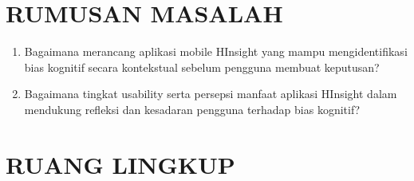 \documentclass[11pt]{article}
\begin{document}
\section{RUMUSAN MASALAH}
 
\begin{enumerate}
  \item Bagaimana merancang aplikasi mobile HInsight yang mampu mengidentifikasi bias kognitif secara kontekstual sebelum pengguna membuat keputusan?
  \item Bagaimana tingkat usability serta persepsi manfaat aplikasi HInsight dalam mendukung refleksi dan kesadaran pengguna terhadap bias kognitif?
\end{enumerate}
 
\section{RUANG LINGKUP}
 
\end{document}
